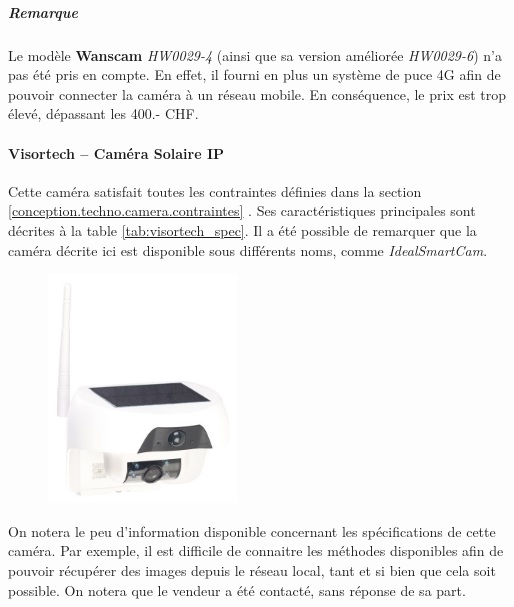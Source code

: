 \subparagraph{Remarque} Le modèle \textbf{Wanscam} \textit{HW0029-4} (ainsi que sa version améliorée \textit{HW0029-6}) n'a pas été pris en compte. En effet, il fourni en plus un système de puce 4G afin de pouvoir connecter la caméra à un réseau mobile. En conséquence, le prix est trop élevé, dépassant les 400.- CHF.

\paragraph{\textbf{Visortech} -- Caméra Solaire IP}
Cette caméra satisfait toutes les contraintes définies dans la section \ref{conception.techno.camera.contraintes} . Ses caractéristiques principales sont décrites à la table \ref{tab:visortech_spec}. Il a été possible de remarquer que la caméra décrite ici est disponible sous différents noms, comme \textit{IdealSmartCam}.

\begin{figure}[ht]
    \includegraphics[width=50mm]{img/conception/visortech_cam.jpg}
    \centering
\end{figure}

On notera le peu d'information disponible concernant les spécifications de cette caméra. Par exemple, il est difficile de connaitre les méthodes disponibles afin de pouvoir récupérer des images depuis le réseau local, tant et si bien que cela soit possible. On notera que le vendeur a été contacté, sans réponse de sa part.

